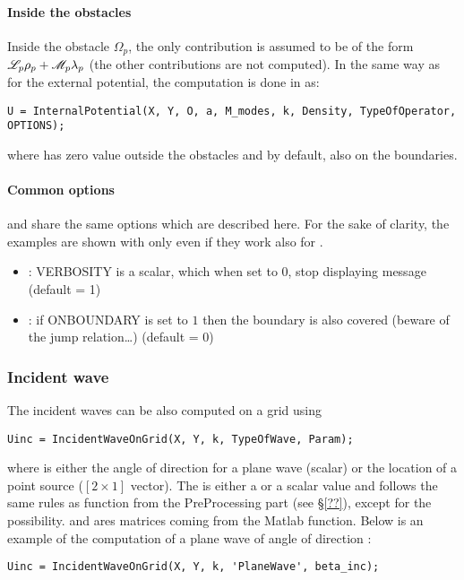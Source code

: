 \paragraph{Inside the obstacles}
Inside the obstacle $\Omega_p$, the only contribution is assumed to be of the form ${\mathscr L}_p\rho_p + {\mathscr M}_p\lambda_p$ (the other contributions are not computed). In the same way as for the external potential, the computation is done in \mudiff as:
\begin{verbatim}
U = InternalPotential(X, Y, O, a, M_modes, k, Density, TypeOfOperator, OPTIONS);
\end{verbatim}
where  has zero value outside the obstacles and by default, also on the boundaries.

\paragraph{Common options}

 and  share the same options which are described here. For the sake of clarity, the examples are shown with only  even if they work also for .
\begin{itemize}
\item {} : VERBOSITY is a scalar, which when set to 0, stop displaying message (default = 1)
\item {} : if ONBOUNDARY is set to $1$ then the boundary is also covered (beware of the jump relation\ldots) (default = 0)
\end{itemize}

\subsubsection{Incident wave}

The incident waves can be also computed on a grid using 
\begin{verbatim}
Uinc = IncidentWaveOnGrid(X, Y, k, TypeOfWave, Param);
\end{verbatim}
where  is either the angle of direction for a plane wave (scalar) or the location of a point source ($[2\times1]$ vector). The  is either a  or a scalar value and follows the same rules as  function from the PreProcessing part (see \S\ref{??}), except for the  possibility.  and  ares matrices coming from the  Matlab function. Below is an example of the computation of a plane wave of angle of direction :
\begin{verbatim}
Uinc = IncidentWaveOnGrid(X, Y, k, 'PlaneWave', beta_inc);
\end{verbatim}

